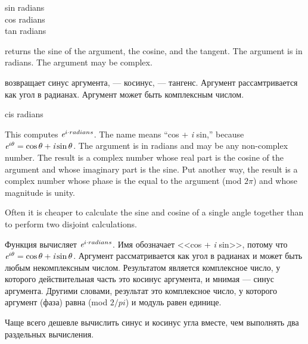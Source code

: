 \begin{defun}[Function]
sin radians \\
cos radians \\
tan radians

 returns the sine of the argument,  the cosine,
and  the tangent.  The argument is in radians.
The argument may be complex.

 возвращает синус аргумента,  --- косинус,  ---
тангенс. Аргумент рассамтривается как угол в радианах. Аргумент может быть
комплексным числом.
\end{defun}

\begin{defun}[Function]
cis radians

This computes $ \emph{e} ^ {i \cdot radians} $.
The name  means ``cos + \emph{i} sin,'' because
$ \emph{e} ^{ i \theta } = \cos \theta + \emph{i} \sin \theta $.
The argument is in
radians and may be any non-complex number.  The result is a complex
number whose real part is the cosine of the argument and whose imaginary
part is the sine.  Put another way, the result is a complex number whose
phase is the equal to the argument (mod $2\pi$)
and whose magnitude is unity.

\beforenoterule
\begin{implementation}
Often it is cheaper to calculate the sine and cosine
of a single angle together than to perform two disjoint calculations.
\end{implementation}
\afternoterule

Функция вычисляет $ \emph{e} ^ {i \cdot radians} $.
Имя  обозначает <<cos + \emph{i} sin>>, потому что 
$ \emph{e} ^{ i \theta } = \cos \theta + \emph{i} \sin \theta $.
Аргумент рассматривается как угол в радианах и может быть любым некомплексным
числом. Результатом является комплексное число, у которого действительная часть
это косинус аргумента, и мнимая --- синус аргумента. Другими словами, результат
это комплексное число, у которого аргумент (фаза) равна (mod $2/pi$) и модуль
равен единице.

\beforenoterule
\begin{implementation}
Чаще всего дешевле вычислить синус и косинус угла вместе, чем выполнять два
раздельных вычисления.
\end{implementation}
\afternoterule
\end{defun}

